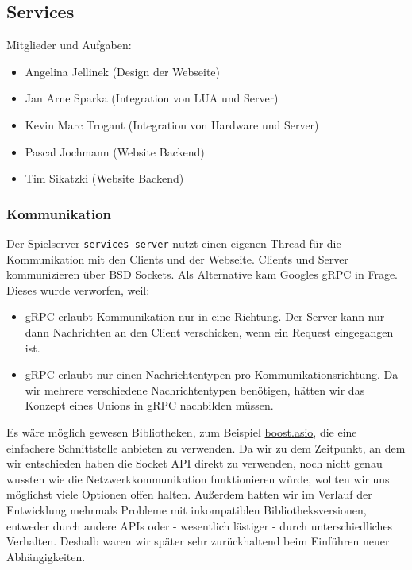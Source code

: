 \subsection{Services}
\label{services}

Mitglieder und Aufgaben:
\begin{itemize}
  \item
    Angelina Jellinek (Design der Webseite)
  \item
    Jan Arne Sparka (Integration von LUA und Server)
  \item
    Kevin Marc Trogant (Integration von Hardware und Server)
  \item
    Pascal Jochmann (Website Backend)
  \item
    Tim Sikatzki (Website Backend)
\end{itemize}

\subsubsection{Kommunikation}

Der Spielserver \texttt{services-server} nutzt einen eigenen Thread für die Kommunikation mit den Clients und
der Webseite. Clients und Server kommunizieren über BSD Sockets.
Als Alternative kam Googles gRPC in Frage. Dieses wurde verworfen, weil:
\begin{itemize}
    \item gRPC erlaubt Kommunikation nur in eine Richtung. Der Server kann nur dann Nachrichten an den Client verschicken,  wenn ein Request eingegangen ist.
    \item gRPC erlaubt nur einen Nachrichtentypen pro Kommunikationsrichtung. Da wir mehrere verschiedene Nachrichtentypen benötigen, hätten wir das Konzept eines Unions in gRPC nachbilden müssen.
\end{itemize}
Es wäre möglich gewesen Bibliotheken, zum Beispiel \href{http://think-async.com/Asio/WebHome}{boost.asio}, die eine einfachere Schnittstelle anbieten zu verwenden. Da wir zu dem Zeitpunkt, an dem wir entschieden haben die Socket API direkt zu verwenden, noch nicht genau wussten wie die Netzwerkkommunikation funktionieren würde, wollten wir uns möglichst viele Optionen offen halten. Außerdem hatten wir im Verlauf der Entwicklung mehrmals Probleme mit inkompatiblen Bibliotheksversionen, entweder durch andere APIs oder - wesentlich lästiger - durch unterschiedliches Verhalten. Deshalb waren wir später sehr zurückhaltend beim Einführen neuer Abhängigkeiten.

